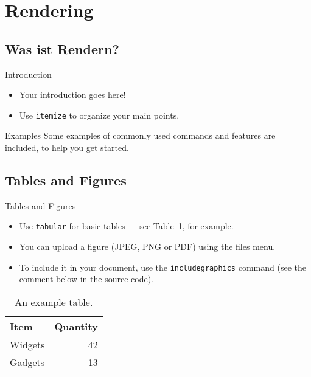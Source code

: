 \section{Rendering}
\subsection{Was ist Rendern?}
	
	\begin{frame}{Introduction}
		
		\begin{itemize}
			\item Your introduction goes here!
			\item Use \texttt{itemize} to organize your main points.
		\end{itemize}
		
		\vskip 1cm
		
		\begin{block}{Examples}
			Some examples of commonly used commands and features are included, to help you get started.
		\end{block}
		
	\end{frame}
	
	
	\subsection{Tables and Figures}
	
	\begin{frame}{Tables and Figures}
		
		\begin{itemize}
			\item Use \texttt{tabular} for basic tables --- see Table~\ref{tab:widgets}, for example.
			\item You can upload a figure (JPEG, PNG or PDF) using the files menu. 
			\item To include it in your document, use the \texttt{includegraphics} command (see the comment below in the source code).
		\end{itemize}
		
		
		\begin{table}
			\centering
			\begin{tabular}{l|r}
				Item & Quantity \\\hline
				Widgets & 42 \\
				Gadgets & 13
			\end{tabular}
			\caption{\label{tab:widgets}An example table.}
		\end{table}
		
	\end{frame}
	
